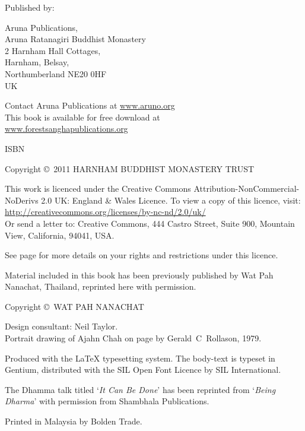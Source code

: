 {
\mbox{}\newpage\thispagestyle{empty}%
{\Small\setlength{\parskip}{1em}\setlength{\parindent}{0em}%
{\raggedright%

\thetitle

Published by:

Aruna Publications,\\
Aruna Ratanagiri Buddhist Monastery\\
2 Harnham Hall Cottages,\\
Harnham, Belsay,\\
Northumberland NE20 0HF\\
UK

Contact Aruna Publications at \href{http://aruno.org}{www.aruno.org}\\
This book is available for free download at\\
\href{http://forestsanghapublications.org/}{www.forestsanghapublications.org}

ISBN \theISBN

Copyright \copyright\ 2011 HARNHAM BUDDHIST MONASTERY TRUST

\vfill

{\copyrightsmall

This work is licenced under the Creative Commons Attribution-NonCommercial-NoDerivs 2.0 UK: England \& Wales Licence. To view a copy of this licence, visit:\\
\href{http://creativecommons.org/licenses/by-nc-nd/2.0/uk/}{http://creativecommons.org/licenses/by-nc-nd/2.0/uk/}\\
Or send a letter to: Creative Commons, 444 Castro Street, Suite 900, Mountain View, California, 94041, USA.

See page \pageref{cc-details} for more details on your rights and restrictions under this licence.

Material included in this book has been previously published by Wat Pah Nanachat, Thailand, reprinted here with permission.

Copyright \copyright\ WAT PAH NANACHAT

Design consultant: Neil Taylor.\\ Portrait drawing of Ajahn Chah on page \pageref{aj-chah-portrait} by Gerald~C~Rollason, 1979.

Produced with the {\selectfont\LaTeX} typesetting system. The body-text is typeset in Gentium, distributed with the SIL Open Font Licence by SIL International.

\theEditionInfo

The Dhamma talk titled `\textit{It Can Be Done}' has been reprinted from
`\textit{Being Dharma}' with permission from Shambhala Publications.

Printed in Malaysia by Bolden Trade.

}

}}

}
